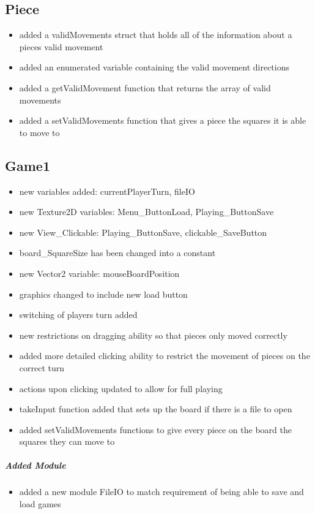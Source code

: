 \documentclass[10pt]{article}
\begin{document}
	\subsection{Piece}
	\begin{itemize}
	\item added a validMovements struct that holds all of the information about a pieces valid movement
	\item added an enumerated variable containing the valid movement directions
	\item added a getValidMovement function that returns the array of valid movements
	\item added a setValidMovements function that gives a piece the squares it is able to move to	
	\end{itemize}
	
	\subsection{Game1}	
	\begin{itemize}
	\item new variables added: currentPlayerTurn, fileIO 
	\item new Texture2D variables: Menu\_ButtonLoad, Playing\_ButtonSave
	\item new View\_Clickable: Playing\_ButtonSave, clickable\_SaveButton
	\item board\_SquareSize has been changed into a constant
	\item new Vector2 variable: mouseBoardPosition
	\item graphics changed to include new load button 
	\item switching of players turn added
	\item new restrictions on dragging ability so that pieces only moved correctly
	\item added more detailed clicking ability to restrict the movement of pieces on the correct turn
	\item actions upon clicking updated to allow for full playing
	\item takeInput function added that sets up the board if there is a file to open
	\item added setValidMovements functions to give every piece on the board the squares they can move to	
	\end{itemize}	
	
	\subparagraph{Added Module}
	\begin{itemize}
	\item added a new module FileIO to match requirement of being able to save and load games
	\end{itemize}
\newpage
\end{document}
